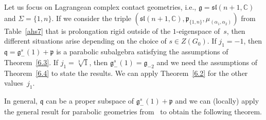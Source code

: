 \documentclass[10pt,a4paper]{amsart}
\newcommand{\fg}{\mathfrak g}
\newcommand{\fv}{\mathfrak q}
\newcommand{\fp}{\mathfrak p}
\numberwithin{equation}{section}
\begin{document}
\begin{Example}
Let us focus on Lagrangean complex contact geometries, i.e., $\fg=\mathfrak{sl}(n+1,\mathbb{C})$ and $\Sigma=\{1,n\}$. If we consider the triple $(\mathfrak{sl}(n+1,\mathbb{C}),\fp_{\{1,n\}},\mu_{(\alpha_1,\alpha_2)})$ from Table~\ref{ahs7} that is prolongation rigid outside of the $1$-eigenspace of~$s$, then dif\/ferent situations arise depending on the choice of $s\in Z(G_0)$. If $j_1=-1$, then $\fv=\fg_{-}^s(1)+\fp$ is a parabolic subalgebra satisfying the assumptions of Theorem~\ref{6.3}. If $j_1=\sqrt[3]{1}$, then $\fg_{-}^s(1)=\fg_{-2}$ and we need the assumptions of Theorem~\ref{6.4} to state the results. We can apply Theorem~\ref{6.2} for the other values~$j_1$.
\end{Example}

In general, $\fv$ can be a proper subspace of $\fg_{-}^s(1)+\fp$ and we can (locally) apply the general result for parabolic geometries from~\cite{cap-cor} to obtain the following theorem.
\end{document}
